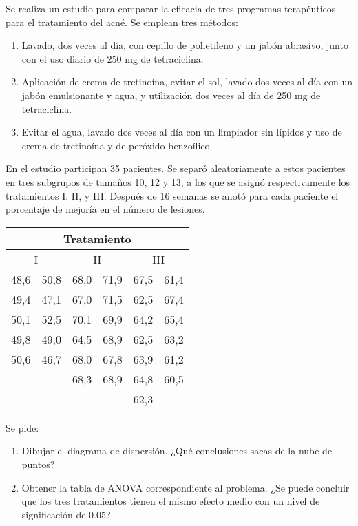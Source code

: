 
{Se realiza un estudio para comparar la eficacia de tres programas terapéuticos para el tratamiento del acné.
Se emplean tres métodos:
\begin{enumerate}
\item Lavado, dos veces al día, con cepillo de polietileno y un jabón abrasivo, junto con el uso diario de 250 mg de tetraciclina.
\item Aplicación de crema de tretinoína, evitar el sol, lavado dos veces al día con un jabón emulsionante y agua, y utilización dos veces al día de 250 mg de tetraciclina.
\item Evitar el agua, lavado dos veces al día con un limpiador sin lípidos y uso de crema de tretinoína y de peróxido benzoílico.
\end{enumerate}
En el estudio participan 35 pacientes. Se separó aleatoriamente a estos pacientes en tres subgrupos de tamaños 10, 12 y 13, a los que se asignó respectivamente los tratamientos I, II, y III.
Después de 16 semanas se anotó para cada paciente el porcentaje de mejoría en el número de lesiones.
\begin{center}
\begin{tabular}{ll|ll|ll}
\multicolumn{6}{c}{Tratamiento} \\
\hline
\multicolumn{2}{c}{I} & \multicolumn{2}{c}{II} & \multicolumn{2}{c}{III} \\
\hline
48,6 & 50,8 & 68,0 & 71,9 & 67,5 & 61,4 \\
49,4 & 47,1 & 67,0 & 71,5 & 62,5 & 67,4 \\
50,1 & 52,5 & 70,1 & 69,9 & 64,2 & 65,4 \\
49,8 & 49,0 & 64,5 & 68,9 & 62,5 & 63,2 \\
50,6 & 46,7 & 68,0 & 67,8 & 63,9 & 61,2 \\
 &  & 68,3 & 68,9 & 64,8 & 60,5 \\
 & \multicolumn{1}{l}{} &  &  & 62,3 &  \\
\hline
\end{tabular}
\end{center}
Se pide:
\begin{enumerate}
\item Dibujar el diagrama de dispersión.
¿Qué conclusiones sacas de la nube de puntos?
\item Obtener la tabla de ANOVA correspondiente al problema.
¿Se puede concluir que los tres tratamientos tienen el mismo efecto medio con un nivel de significación de $0.05$?
\end{enumerate}
}


